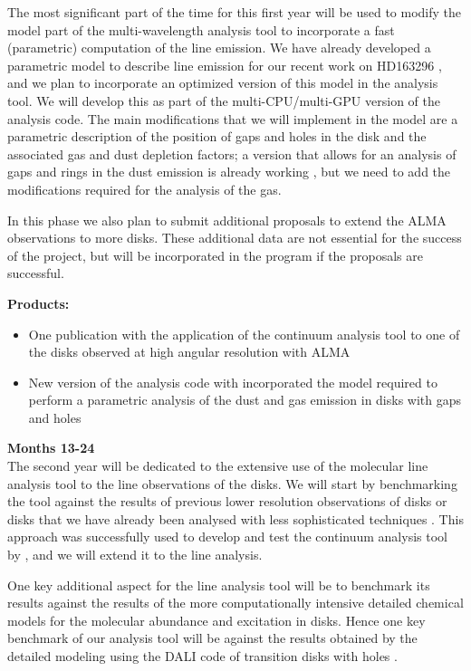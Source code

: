 \documentclass[10pt,fleqn,twoside]{article}
\begin{document}
The most significant part of the time for this first year will be used to modify the model part of the multi-wavelength analysis tool to incorporate a fast (parametric) computation of the line emission. We have already developed a parametric model to describe line emission for our recent work on HD163296 \citep{Isella2016}, and we plan to incorporate an optimized version of this model in the analysis tool. 
We will develop this as part of the multi-CPU/multi-GPU version of the analysis code.  The main modifications that we will implement in the model are a parametric description of the position of gaps and holes in the disk and the associated gas and dust depletion factors; a version that allows for an analysis of gaps and rings in the dust emission is already working \citep[e.g.\ ][]{2016A&A...588A.112G}, but we need to add the modifications required for the analysis of the gas.

In this phase we also plan to submit additional proposals to extend the ALMA observations to more disks. These additional data are not essential for the success of the project, but will be incorporated in the program if the proposals are successful.

\smallskip
{\bf Products:} 
\begin{itemize}
\item One publication with the application of the continuum analysis tool to one of the disks observed at high angular resolution with ALMA
\item New version of the analysis code with incorporated the model required to perform a parametric analysis of the dust and gas emission in disks with gaps and holes
\end{itemize}

{\Tcol\bf Months 13-24}\\
The second year will be dedicated to the extensive use of the molecular line analysis tool to
the line observations of the disks. We will start by benchmarking the tool against the results of previous lower resolution observations of disks or disks that we have already been analysed with less sophisticated techniques \citep[e.g.][]{Isella2016}. This approach was successfully used to develop and test the continuum analysis tool by \citet{2016A&A...588A..53T}, and we will extend it to the line analysis. 

One key additional aspect for the line analysis tool will be to benchmark its results against the results of the more computationally intensive detailed chemical models for the molecular abundance and excitation in disks. Hence one key benchmark of our analysis tool will be against the results obtained by the detailed modeling using the DALI code of transition disks with holes \citep{2016A&A...585A..58V}. 
\end{document}
